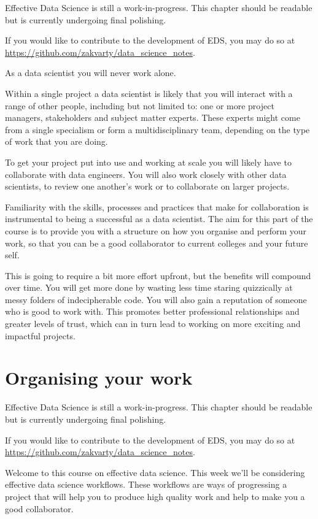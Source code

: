 \documentclass[
  12pt,
]{book}
\begin{document}
Effective Data Science is still a work-in-progress. This chapter should be readable but is currently undergoing final polishing.

If you would like to contribute to the development of EDS, you may do so at \url{https://github.com/zakvarty/data_science_notes}.

As a data scientist you will never work alone.

Within a single project a data scientist is likely that you will interact with a range of other people, including but not limited to: one or more project managers, stakeholders and subject matter experts. These experts might come from a single specialism or form a multidisciplinary team, depending on the type of work that you are doing.

To get your project put into use and working at scale you will likely have to collaborate with data engineers. You will also work closely with other data scientists, to review one another's work or to collaborate on larger projects.

Familiarity with the skills, processes and practices that make for collaboration is instrumental to being a successful as a data scientist. The aim for this part of the course is to provide you with a structure on how you organise and perform your work, so that you can be a good collaborator to current colleges and your future self.

This is going to require a bit more effort upfront, but the benefits will compound over time. You will get more done by wasting less time staring quizzically at messy folders of indecipherable code. You will also gain a reputation of someone who is good to work with. This promotes better professional relationships and greater levels of trust, which can in turn lead to working on more exciting and impactful projects.

\hypertarget{workflows-organising-your-work}{%
\chapter{Organising your work}\label{workflows-organising-your-work}}

Effective Data Science is still a work-in-progress. This chapter should be readable but is currently undergoing final polishing.

If you would like to contribute to the development of EDS, you may do so at \url{https://github.com/zakvarty/data_science_notes}.

Welcome to this course on effective data science. This week we'll be considering effective data science workflows. These workflows are ways of progressing a project that will help you to produce high quality work and help to make you a good collaborator.
\end{document}
